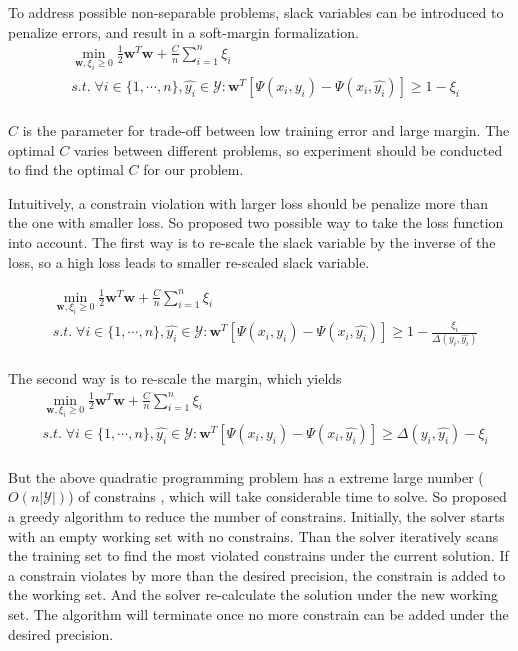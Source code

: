 To address possible non-separable problems, slack variables can be introduced to penalize errors, and result in a soft-margin formalization.
$$
\begin{aligned}
   & \min_{\mathbf{w}, \xi_i \geq 0} \frac{1}{2}\mathbf{w}^T\mathbf{w} + \frac{C}{n}\sum^n_{i=1}\xi_i\\
    &s.t.\; \forall i \in \{1,\cdots,n\},\hat{y_i} \in \mathcal{Y}: \mathbf{w}^T[\Psi(x_i,y_i) - \Psi(x_i,\hat{y_i})] \geq 1 - \xi_i \\
\end{aligned}
$$

$C$ is the parameter for trade-off between low training error and large margin. The optimal $C$ varies between different problems, so experiment should be conducted to find the optimal $C$ for our problem.

Intuitively, a constrain violation with larger loss should be penalize more than the one with smaller loss. So \cite{svm2005} proposed two possible way to take the loss function into account. The first way is to re-scale the slack variable by the inverse of the loss, so a high loss leads to smaller re-scaled slack variable. 

$$
\begin{aligned}
   & \min_{\mathbf{w}, \xi_i \geq 0} \frac{1}{2}\mathbf{w}^T\mathbf{w} + \frac{C}{n} \sum^n_{i=1}\xi_i\\
    &s.t.\; \forall i \in \{1,\cdots,n\},\hat{y_i} \in \mathcal{Y}: \mathbf{w}^T[\Psi(x_i,y_i) - \Psi(x_i,\hat{y_i})] \geq 1 - \frac{\xi_i}{\Delta(y_i, \hat{y_i})} \\
\end{aligned}
$$

The second way is to re-scale the margin, which yields 
$$
\begin{aligned}
   & \min_{\mathbf{w}, \xi_i \geq 0} \frac{1}{2}\mathbf{w}^T\mathbf{w} + \frac{C}{n} \sum^n_{i=1}\xi_i\\
    &s.t.\; \forall i \in \{1,\cdots,n\},\hat{y_i} \in \mathcal{Y}: \mathbf{w}^T[\Psi(x_i,y_i) - \Psi(x_i,\hat{y_i})] \geq \Delta(y_i, \hat{y_i}) - \xi_i\\
%
\end{aligned}
$$

But the above quadratic programming problem has a extreme large number ($O(n|\mathcal{Y}|)$) of constrains , which will take considerable time to solve. So \cite{svm2005} proposed a greedy algorithm to reduce the number of constrains. Initially, the solver starts with an empty working set with no constrains. Than the solver iteratively scans the training set to find the most violated constrains under the current solution. If a constrain violates by more than the desired precision, the constrain is added to the working set. And the solver re-calculate the solution under the new working set. The algorithm will terminate once no more constrain can be added under the desired precision.


